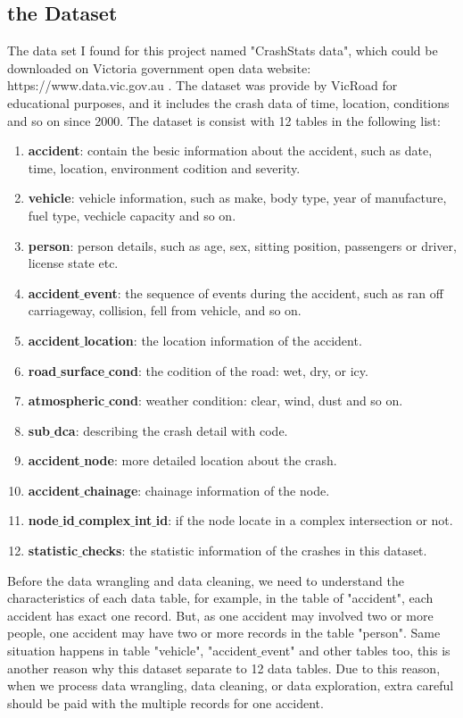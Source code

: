 \documentclass[11pt]{article}
\theoremstyle{definition}
\begin{document}
\subsection{the Dataset}
The data set I found for this project named "CrashStats data", which could be downloaded on Victoria government open data website: https://www.data.vic.gov.au . The dataset was provide by VicRoad for educational purposes, and it includes the crash data of time, location, conditions and so on since 2000. The dataset is consist with 12 tables in the following list:
\begin{enumerate}
	\item \textbf{accident}:	contain the besic information about the accident, such as date, time, location, environment codition and severity.
	\item \textbf{vehicle}:	vehicle information, such as make, body type, year of manufacture, fuel type, vechicle capacity and so on.
	\item \textbf{person}:	person details, such as age, sex, sitting position, passengers or driver, license state etc.	
	\item \textbf{accident$\_$event}: the sequence of events during the accident, such as ran off carriageway, collision, fell from vehicle, and so on.
	\item \textbf{accident$\_$location}:	the location information of the accident.
	\item \textbf{road$\_$surface$\_$cond}:	the codition of the road: wet, dry, or icy.
	\item \textbf{atmospheric$\_$cond}:	weather condition: clear, wind, dust and so on.
	\item \textbf{sub$\_$dca}:	describing the crash detail with code.
	\item \textbf{accident$\_$node}:	more detailed location about the crash.
	\item \textbf{accident$\_$chainage}:	chainage information of the node.
	\item \textbf{node$\_$id$\_$complex$\_$int$\_$id}:	if the node locate in a complex intersection or not.
	\item \textbf{statistic$\_$checks}:	the statistic information of the crashes in this dataset.
\end{enumerate}
Before the data wrangling and data cleaning, we need to understand the characteristics of each data table, for example, in the table of "accident", each accident has exact one record. But, as one accident may involved two or more people, one accident may have two or more records in the table "person". Same situation happens in table "vehicle", "accident$\_$event" and other tables too, this is another reason why this dataset separate to 12 data tables. Due to this reason, when we process data wrangling, data cleaning, or data exploration, extra careful should be paid with the multiple records for one accident. 
	
\end{document}
